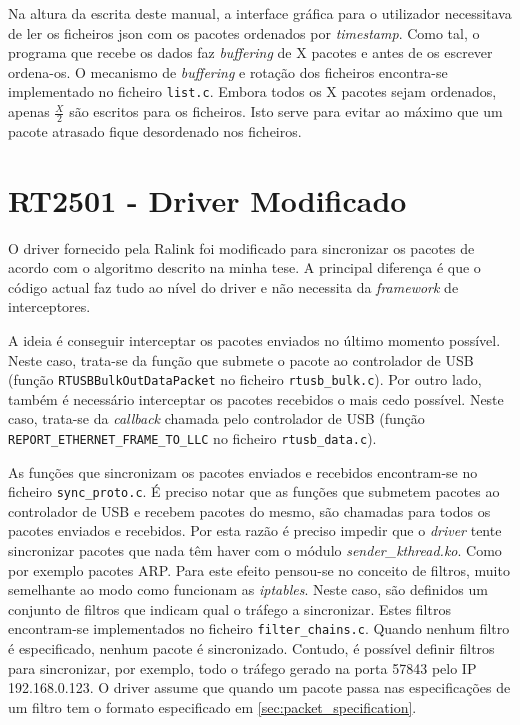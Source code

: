 \documentclass[10pt,a4paper,oneside]{book}
\begin{document}
    Na altura da escrita deste manual, a interface gráfica para o utilizador necessitava de ler os ficheiros json com os pacotes ordenados por \emph{timestamp}. Como tal, o programa que recebe os dados faz \emph{buffering} de X pacotes e antes de os escrever ordena-os. O mecanismo de \emph{buffering} e rotação dos ficheiros encontra-se implementado no ficheiro {\tt list.c}. Embora todos os X pacotes sejam ordenados, apenas $\frac{X}{2}$ são escritos para os ficheiros. Isto serve para evitar ao máximo que um pacote atrasado fique desordenado nos ficheiros.
    
\section{RT2501 - Driver Modificado}\label{sec:driver}

O driver fornecido pela Ralink foi modificado para sincronizar os pacotes de acordo com o algoritmo descrito na minha tese. A principal diferença é que o código actual faz tudo ao nível do driver e não necessita da \emph{framework} de interceptores.

A ideia é conseguir interceptar os pacotes enviados no último momento possível. Neste caso, trata-se da função que submete o pacote ao controlador de USB (função {\tt RTUSBBulkOutDataPacket} no ficheiro {\tt rtusb\_bulk.c}). Por outro lado, também é necessário interceptar os pacotes recebidos o mais cedo possível. Neste caso, trata-se da \emph{callback} chamada pelo controlador de USB (função {\tt REPORT\_ETHERNET\_FRAME\_TO\_LLC} no ficheiro {\tt rtusb\_data.c}).

As funções que sincronizam os pacotes enviados e recebidos encontram-se no ficheiro {\tt sync\_proto.c}. É preciso notar que as funções que submetem pacotes ao controlador de USB e recebem pacotes do mesmo, são chamadas para todos os pacotes enviados e recebidos. Por esta razão é preciso impedir que o \emph{driver} tente sincronizar pacotes que nada têm haver com o módulo \emph{sender\_kthread.ko}. Como por exemplo pacotes ARP. Para este efeito pensou-se no conceito de filtros, muito semelhante ao modo como funcionam as \emph{iptables}. Neste caso, são definidos um conjunto de filtros que indicam qual o tráfego a sincronizar. Estes filtros encontram-se implementados no ficheiro {\tt filter\_chains.c}. Quando nenhum filtro é especificado, nenhum pacote é sincronizado. Contudo, é possível definir filtros para sincronizar, por exemplo, todo o tráfego gerado na porta 57843 pelo IP 192.168.0.123. O driver assume que quando um pacote passa nas especificações de um filtro tem o formato especificado em \ref{sec:packet_specification}.
\end{document}
